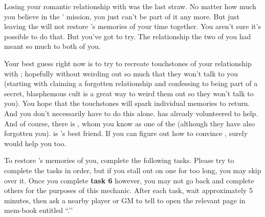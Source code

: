 \documentclass[green]{GL2020}
\begin{document}
\name{\gRestoringLove{}}

Losing your romantic relationship with \cHeadScientist{\full} was the last straw. No matter how much you believe in the \pGoaties{}’ mission, you just can’t be part of it any more. But just leaving the \pGoaties{} will not restore \cHeadScientist{}’s memories of your time together. You aren’t sure it’s possible to do that. But you’ve got to try. The relationship the two of you had meant so much to both of you.

Your best guess right now is to try to recreate touchstones of your relationship with \cHeadScientist{}; hopefully without weirding \cHeadScientist{\them} out so much that they won’t talk to you (starting with claiming a forgotten relationship and confessing to being part of a secret, blasphemous cult is a great way to weird them out so they won’t talk to you). You hope that the touchstones will spark individual memories to return. And you don’t necessarily have to do this alone. \cInitiate{\full} has already volunteered \cInitiate{\themself} to help. And of course, there is \cChupInventor{\full}, whom you know as one of the \pGoaties{} (although they have also forgotten you). \cChupInventor{} is \cHeadScientist{}’s best friend. If you can figure out how to convince \cChupInventor{\them}, surely \cChupInventor{\they} would help you too.

To restore \cHeadScientist{}’s memories of you, complete the following tasks. Please try to complete the tasks in order, but if you stall out on one for too long, you may skip over it. Once you complete \textbf{task 6} however, you may not go back and complete others for the purposes of this mechanic. After each task, wait approximately 5 minutes, then ask a nearby player or GM to tell \cHeadScienist{} to open the relevant page in \cHeadScientist{\their} mem-book entitled ``\mIdleThoughts{}.’’
\end{document}
